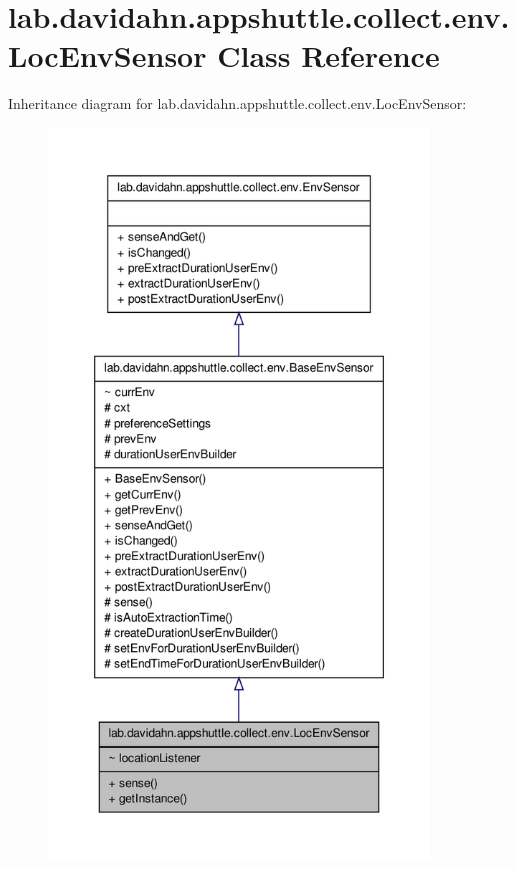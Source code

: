 \hypertarget{classlab_1_1davidahn_1_1appshuttle_1_1collect_1_1env_1_1_loc_env_sensor}{\section{lab.\-davidahn.\-appshuttle.\-collect.\-env.\-Loc\-Env\-Sensor \-Class \-Reference}
\label{classlab_1_1davidahn_1_1appshuttle_1_1collect_1_1env_1_1_loc_env_sensor}
}


\-Inheritance diagram for lab.\-davidahn.\-appshuttle.\-collect.\-env.\-Loc\-Env\-Sensor\-:
\nopagebreak
\begin{figure}[H]
\begin{center}
\leavevmode
\includegraphics[height=550pt]{classlab_1_1davidahn_1_1appshuttle_1_1collect_1_1env_1_1_loc_env_sensor__inherit__graph}
\end{center}
\end{figure}


